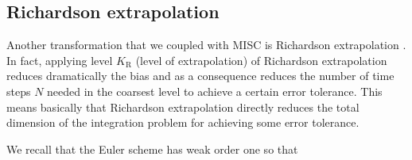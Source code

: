 


%


\subsection{Richardson extrapolation}\label{sec:Richardson extrapolation}


Another transformation that we coupled with MISC is Richardson extrapolation \cite{talay1990expansion}. In fact, applying level $K_\text{R}$ (level of extrapolation) of Richardson extrapolation reduces dramatically the bias and as a consequence reduces the  number of time steps $N$ needed in the coarsest level to achieve a certain error tolerance. This means basically that Richardson extrapolation directly reduces  the total dimension of the integration problem for achieving some error tolerance.


We  recall that the Euler scheme has weak order one so that

